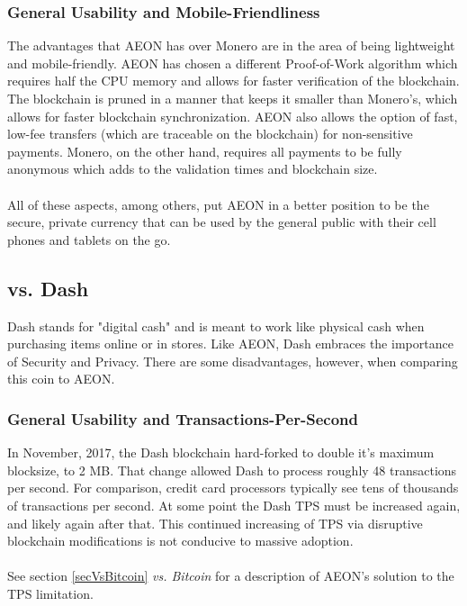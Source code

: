 \subsubsection{General Usability and Mobile-Friendliness}
The advantages that AEON has over Monero are in the area of being lightweight and mobile-friendly.  AEON has chosen a different Proof-of-Work algorithm which requires half the CPU memory and allows for faster verification of the blockchain.  The blockchain is pruned in a manner that keeps it smaller than Monero's, which allows for faster blockchain synchronization.  AEON also allows the option of fast, low-fee transfers (which are traceable on the blockchain) for non-sensitive payments.  Monero, on the other hand, requires all payments to be fully anonymous which adds to the validation times and blockchain size.\\
\\
All of these aspects, among others, put AEON in a better position to be the secure, private currency that can be used by the general public with their cell phones and tablets on the go.

\subsection{vs. Dash}
Dash stands for "digital cash" and is meant to work like physical cash when purchasing items online or in stores.  Like AEON, Dash embraces the importance of Security and Privacy.  There are some disadvantages, however, when comparing this coin to AEON.

\subsubsection{General Usability and Transactions-Per-Second}
In November, 2017, the Dash blockchain hard-forked to double it's maximum blocksize, to 2 MB. That change allowed Dash to process roughly 48 transactions per second.  For comparison, credit card processors typically see tens of thousands of transactions per second.  At some point the Dash TPS must be increased again, and likely again after that.  This continued increasing of TPS via disruptive blockchain modifications is not conducive to massive adoption.\\
\\
See section \ref{secVsBitcoin} \textit{vs. Bitcoin} for a description of AEON's solution to the TPS limitation.

